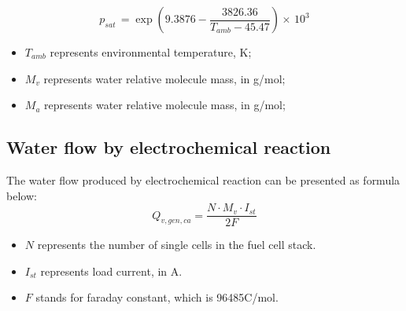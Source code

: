 \begin{equation}
	p_{sat}\,= \exp \left(9.3876-{\frac{3826.36}{T_{a m b}-45.47}}\right)\times\,10^{3}
\end{equation}
\begin{itemize}
	\item $T_{amb}$ represents environmental temperature, K;
	\item $M_{v}$ represents water relative molecule mass, in g/mol;
	\item $M_{a}$ represents water relative molecule mass, in g/mol;
\end{itemize}
\subsection*{Water flow by electrochemical reaction}
The water flow produced by electrochemical reaction can be presented as formula below:
\begin{equation}
	Q_{v,g e n,c a}=\frac{{N\cdot M_{v}\cdot I_{s t}}}{2F}
\end{equation}
\begin{itemize}
	\item $N$ represents the number of single cells in the fuel cell stack.
	\item $I_{st}$ represents load current, in A.
	\item $F$ stands for faraday constant, which is 96485C/mol.
\end{itemize}
